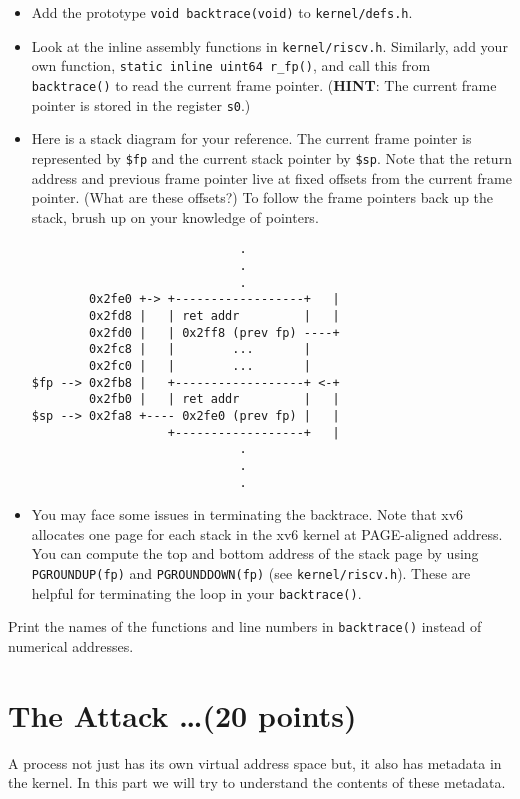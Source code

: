 \documentclass[11pt]{exam}
\begin{document}
\begin{questions}
\begin{itemize}
    \item Add the prototype \texttt{void backtrace(void)} to {\tt kernel/defs.h}.
    \item Look at the inline assembly functions in {\tt kernel/riscv.h}. Similarly, add your own function, \texttt{static inline uint64 r\_fp()}, and call this from {\tt backtrace()} to read the current frame pointer. (\textbf{HINT}: The current frame pointer is stored in the register \texttt{s0}.)
    \item Here is a stack diagram for your reference. The current frame pointer is represented by \texttt{\$fp} and the current stack pointer by \texttt{\$sp}. Note that the return address and previous frame pointer live at fixed offsets from the current frame pointer. (What are these offsets?) To follow the frame pointers back up the stack, brush up on your knowledge of pointers.
    \begin{verbatim}
                             .
                             .
                             .
        0x2fe0 +-> +------------------+   |
        0x2fd8 |   | ret addr         |   |
        0x2fd0 |   | 0x2ff8 (prev fp) ----+
        0x2fc8 |   |        ...       |
        0x2fc0 |   |        ...       |
$fp --> 0x2fb8 |   +------------------+ <-+
        0x2fb0 |   | ret addr         |   |
$sp --> 0x2fa8 +---- 0x2fe0 (prev fp) |   |
                   +------------------+   |
                             .
                             .
                             .
    \end{verbatim}
    \item You may face some issues in terminating the backtrace. Note that xv6 allocates one page for each stack in the xv6 kernel at PAGE-aligned address. You can compute the top and bottom address of the stack page by using {\tt PGROUNDUP(fp)} and {\tt PGROUNDDOWN(fp)} (see {\tt kernel/riscv.h}). These are helpful for terminating the loop in your \texttt{backtrace()}.
\end{itemize}


\question[30] {\bf [OPTIONAL]} Print the names of the functions and line numbers in {\tt backtrace()} instead of numerical addresses.


\end{questions}

\section{The Attack \ldots (20 points)}
A process not just has its own virtual address space but, it also has metadata in the kernel. In this part we will try to understand the contents of these metadata.
\end{document}
